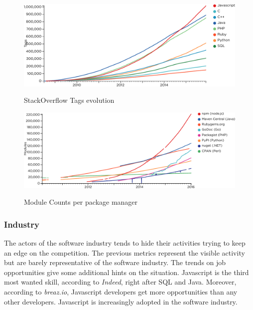 

\begin{figure}
  \centering
  \includegraphics[width=\linewidth]{../resources/stackoverflow-tags.pdf}
  \label{fig:so-tags}
  \caption{StackOverflow Tags evolution}
\end{figure}


\begin{figure}
  \centering
  \includegraphics[width=\linewidth]{../resources/modulecounts.pdf}
  \label{fig:modulecounts}
  \caption{Module Counts per package manager}    
\end{figure}

\subsubsection{Industry}

The actors of the software industry tends to hide their activities trying to keep an edge on the competition.
The previous metrics represent the visible activity but are barely representative of the software industry.
The trends on job opportunities give some additional hints on the situation.
Javascript is the third most wanted skill, according to \textit{Indeed}, right after SQL and Java.
Moreover, according to \textit{breaz.io}, Javascript developers get more opportunities than any other developers.
Javascript is increasingly adopted in the software industry.

